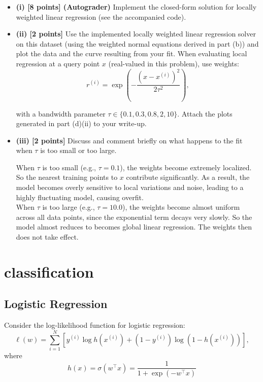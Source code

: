 \documentclass[lang=cn,11pt]{elegantbook}
\begin{document}
\begin{itemize}
    \item \textbf{(i) [8 points] (Autograder)} Implement the closed-form solution for locally weighted linear regression (see the accompanied code).
    \item \textbf{(ii) [2 points]} Use the implemented locally weighted linear regression solver on this dataset (using the weighted normal equations derived in part (b)) and plot the data and the curve resulting from your fit. When evaluating local regression at a query point \( x \) (real-valued in this problem), use weights:
    \[
    r^{(i)} = \exp\left(-\frac{(x - x^{(i)})^2}{2\tau^2}\right),
    \]

    with a bandwidth parameter \( \tau \in \{0.1, 0.3, 0.8, 2, 10\} \). Attach the plots generated in part (d)(ii) to your write-up.



    \item \textbf{(iii) [2 points]} Discuss and comment briefly on what happens to the fit when \( \tau \) is too small or too large.
    \begin{solution}
\noindent      When \( \tau \) is too small (e.g., \( \tau = 0.1 \)), the weights become extremely localized. So the nearest training points to \( x \) contribute significantly. As a result, the model becomes overly sensitive to local variations and noise, leading to a highly fluctuating model, causing overfit.\\
 \noindent       When \( \tau \) is too large (e.g., \( \tau = 10.0 \)), the weights become almost uniform across all data points, since the exponential term decays very slowly. So the model almost reduces to becomes global linear regression. The weights then does not take effect.
    \end{solution}

\end{itemize}


\chapter{classification}

\section{Logistic Regression}

Consider the log-likelihood function for logistic regression:
\begin{equation}
    \ell(w) = \sum_{i=1}^{N} \left[ y^{(i)} \log h(x^{(i)}) + (1 - y^{(i)}) \log (1 - h(x^{(i)})) \right],
\end{equation}
where 
\begin{equation}
    h(x) = \sigma(w^\top x) = \frac{1}{1 + \exp(-w^\top x)}
\end{equation}
\end{document}
